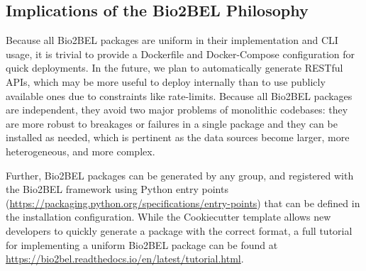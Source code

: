 \subsection*{Implications of the Bio2BEL Philosophy}
Because all Bio2BEL packages are uniform in their implementation and CLI usage, it is trivial to provide a Dockerfile and Docker-Compose configuration for quick deployments.
In the future, we plan to automatically generate RESTful APIs, which may be more useful to deploy internally than to use publicly available ones due to constraints like rate-limits.
Because all Bio2BEL packages are independent, they avoid two major problems of monolithic codebases: they are more robust to breakages or failures in a single package and they can be installed as needed, which is pertinent as the data sources become larger, more heterogeneous, and more complex.

Further, Bio2BEL packages can be generated by any group, and registered with the Bio2BEL framework using Python entry points (\url{https://packaging.python.org/specifications/entry-points}) that can be defined in the installation configuration.
While the Cookiecutter template allows new developers to quickly generate a package with the correct format, a full tutorial for implementing a uniform Bio2BEL package can be found at \url{https://bio2bel.readthedocs.io/en/latest/tutorial.html}.

